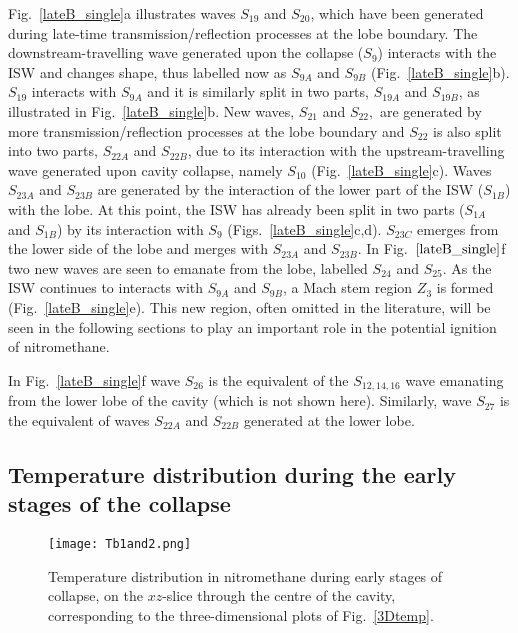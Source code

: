 \documentclass[3p,times,twocolumn]{elsarticle}
\begin{document}
Fig.\  \ref{lateB_single}a illustrates waves $S_{19}$ and $S_{20}$, which
have been generated during late-time transmission/reflection processes at the lobe
boundary. The downstream-travelling wave generated upon the collapse ($S_9$) interacts with the ISW and changes shape, thus labelled now as $S_{9A}$ and $S_{9B}$ (Fig.\  \ref{lateB_single}b). $S_{19}$ interacts with $S_{9A}$ and it is similarly split in two parts, $S_{19A}$ and $S_{19B}$, as illustrated in Fig.\  \ref{lateB_single}b.
New waves, $S_{21}$ and $S_{22},$ are generated by more transmission/reflection
processes at the lobe boundary and $S_{22}$ is also split into two parts, $S_{22A}$
and $S_{22B}$, due to its interaction with the upstream-travelling wave generated upon cavity collapse, namely
$S_{10}$ (Fig.\  \ref{lateB_single}c).
 Waves $S_{23A}$ and $S_{23B}$ are generated by the interaction of the lower part of the ISW ($S_{1B}$)
with the lobe. At this point, the ISW has already been split in two parts
($S_{1A}$ and $S_{1B}$) by its interaction with $S_9$ (Figs.\ 
\ref{lateB_single}c,d). $S_{23C}$ emerges from the lower side
of the lobe and merges with $S_{23A}$ and $S_{23B}$. In Fig.\ $\ref{lateB_single}$f
two new waves are seen to emanate from the lobe, labelled $S_{24}$ and $S_{25}$.
As the ISW continues to interacts with $S_{9A}$ and $S_{9B}$, a Mach stem region
$Z_3$  is formed (Fig.\  \ref{lateB_single}e). This new region, often omitted in the literature, will be seen in the following sections to play an important role in the potential ignition of nitromethane.


In Fig.\  \ref{lateB_single}f wave $S_{26}$ is the equivalent of the $S_{12,14,16}$ wave emanating from the lower lobe of the
cavity (which is not shown here). Similarly, wave $S_{27}$ is the equivalent of waves $S_{22A}$ and
$S_{22B}$ generated at the lower lobe.



\subsection{Temperature distribution during the early stages of the collapse}
\begin{figure*}[!t]
    \centering
\texttt{[image: Tb1and2.png]}
\caption{Temperature distribution in nitromethane during early stages of
collapse, on the $xz$-slice through the centre of the cavity, corresponding to the three-dimensional plots of Fig.\ \ref{3Dtemp}.}
\label{earlyTNM_single}
\end{figure*}
\end{document}
